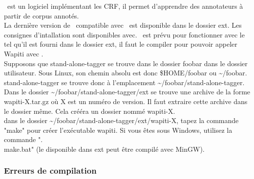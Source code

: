 \documentclass[manual-fr.tex]{subfiles}
\begin{document}
\WapitiCite\ est un logiciel implémentant les CRF, il permet d'apprendre des annotateurs à partir de corpus annotés.\\

La dernière version de \Wapiti\ compatible avec \SEM\ est disponible dans le
dossier ext. Les consignes d'intallation sont disponibles avec. \SEM\ est prévu
pour fonctionner avec le \Wapiti tel qu'il est fourni dans le dossier ext,
il faut le compiler pour pouvoir appeler Wapiti avec \SEM.\\

Supposons que stand-alone-tagger se trouve dans le dossier foobar dans le
dossier utilisateur. Sous Linux, son chemin absolu est donc \$HOME/foobar
ou \~{}/foobar. stand-alone-tagger se trouve donc à l'emplacement
\~{}/foobar/stand-alone-tagger.\\

Dans le dossier \~{}/foobar/stand-alone-tagger/ext se trouve une archive de la
forme wapiti-X.tar.gz où X est un numéro de version. Il faut extraire cette
archive dans le dossier même. Cela crééra un dossier nommé wapiti-X.\\

dans le dossier \~{}/foobar/stand-alone-tagger/ext/wapiti-X, tapez la commande
"make" pour créer l'exécutable wapiti. Si vous êtes sous Windows, utilisez
la commande ".\\make.bat" (le \Wapiti disponible dans ext peut être compilé
avec MinGW).

\subsubsection{Erreurs de compilation}

\end{document}
